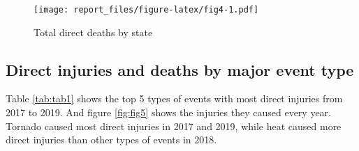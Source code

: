 \documentclass[
]{article}
\newenvironment{Shaded}{\begin{snugshade}}{\end{snugshade}}
\newcommand{\DataTypeTok}[1]{\textcolor[rgb]{0.13,0.29,0.53}{#1}}
\newcommand{\DecValTok}[1]{\textcolor[rgb]{0.00,0.00,0.81}{#1}}
\newcommand{\KeywordTok}[1]{\textcolor[rgb]{0.13,0.29,0.53}{\textbf{#1}}}
\newcommand{\NormalTok}[1]{#1}
\newcommand{\OperatorTok}[1]{\textcolor[rgb]{0.81,0.36,0.00}{\textbf{#1}}}
\newcommand{\OtherTok}[1]{\textcolor[rgb]{0.56,0.35,0.01}{#1}}
\newcommand{\StringTok}[1]{\textcolor[rgb]{0.31,0.60,0.02}{#1}}
\begin{document}
\begin{Shaded}
\end{Shaded}

\begin{figure}
\centering
\texttt{[image: report\_files/figure-latex/fig4-1.pdf]}
\caption{\label{fig:fig4}Total direct deaths by state}
\end{figure}

\clearpage

\hypertarget{direct-injuries-and-deaths-by-major-event-type}{%
\subsection{Direct injuries and deaths by major event type}\label{direct-injuries-and-deaths-by-major-event-type}}

Table \ref{tab:tab1} shows the top 5 types of events with most direct injuries from 2017 to 2019. And figure \ref{fig:fig5} shows the injuries they caused every year. Tornado caused most direct injuries in 2017 and 2019, while heat caused more direct injuries than other types of events in 2018.
\end{document}
